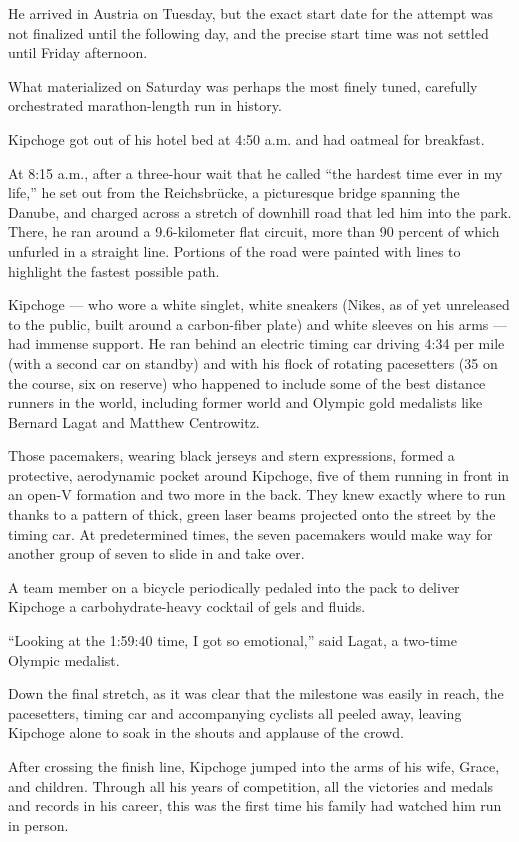 He arrived in Austria on Tuesday, but the exact start date for the
attempt was not finalized until the following day, and the precise start
time was not settled until Friday afternoon.

What materialized on Saturday was perhaps the most finely tuned,
carefully orchestrated marathon-length run in history.

Kipchoge got out of his hotel bed at 4:50 a.m. and had oatmeal for
breakfast.

At 8:15 a.m., after a three-hour wait that he called ``the hardest time
ever in my life,'' he set out from the Reichsbrücke, a picturesque
bridge spanning the Danube, and charged across a stretch of downhill
road that led him into the park. There, he ran around a 9.6-kilometer
flat circuit, more than 90 percent of which unfurled in a straight line.
Portions of the road were painted with lines to highlight the fastest
possible path.

Kipchoge --- who wore a white singlet, white sneakers (Nikes, as of yet
unreleased to the public, built around a carbon-fiber plate) and white
sleeves on his arms --- had immense support. He ran behind an electric
timing car driving 4:34 per mile (with a second car on standby) and with
his flock of rotating pacesetters (35 on the course, six on reserve) who
happened to include some of the best distance runners in the world,
including former world and Olympic gold medalists like Bernard Lagat and
Matthew Centrowitz.

Those pacemakers, wearing black jerseys and stern expressions, formed a
protective, aerodynamic pocket around Kipchoge, five of them running in
front in an open-V formation and two more in the back. They knew exactly
where to run thanks to a pattern of thick, green laser beams projected
onto the street by the timing car. At predetermined times, the seven
pacemakers would make way for another group of seven to slide in and
take over.

A team member on a bicycle periodically pedaled into the pack to deliver
Kipchoge a carbohydrate-heavy cocktail of gels and fluids.

``Looking at the 1:59:40 time, I got so emotional,'' said Lagat, a
two-time Olympic medalist.

Down the final stretch, as it was clear that the milestone was easily in
reach, the pacesetters, timing car and accompanying cyclists all peeled
away, leaving Kipchoge alone to soak in the shouts and applause of the
crowd.

After crossing the finish line, Kipchoge jumped into the arms of his
wife, Grace, and children. Through all his years of competition, all the
victories and medals and records in his career, this was the first time
his family had watched him run in person.

